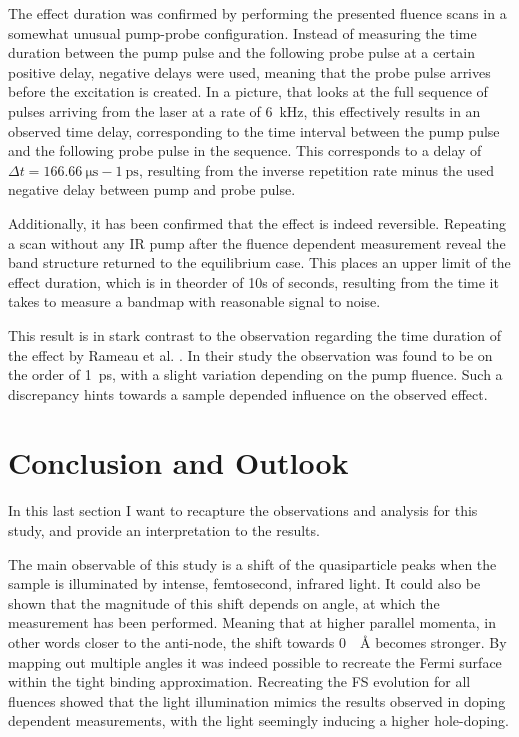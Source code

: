 The effect duration was confirmed by performing the presented fluence scans in a somewhat unusual pump-probe configuration.
Instead of measuring the time duration between the pump pulse and the following probe pulse at a certain positive delay, negative delays were used, meaning that the probe pulse arrives before the excitation is created.
In a picture, that looks at the full sequence of pulses arriving from the laser at a rate of \qty{6}{\kilo\hertz}, this effectively results in an observed time delay, corresponding to the time interval between the pump pulse and the following probe pulse in the sequence.
This corresponds to a delay of $\Delta t = \qty{166.66}{\micro\second} - \qty{1}{\pico\second}$, resulting from the inverse repetition rate minus the used negative delay between pump and probe pulse.

Additionally, it has been confirmed that the effect is indeed reversible.
Repeating a scan without any IR pump after the fluence dependent measurement reveal the band structure returned to the equilibrium case.
This places an upper limit of the effect duration, which is in theorder of 10s of seconds, resulting from the time it takes to measure a bandmap with reasonable signal to noise.

This result is in stark contrast to the observation regarding the time duration of the effect by Rameau et al. \cite{}.
In their study the observation was found to be on the order of \qty{1}{\pico\second}, with a slight variation depending on the pump fluence.
Such a discrepancy hints towards a sample depended influence on the observed effect.

\section{Conclusion and Outlook}

In this last section I want to recapture the observations and analysis for this study, and provide an interpretation to the results.

The main observable of this study is a shift of the quasiparticle peaks when the sample is illuminated by intense, femtosecond, infrared light.
It could also be shown that the magnitude of this shift depends on angle, at which the measurement has been performed.
Meaning that at higher parallel momenta, in other words closer to the anti-node, the shift towards \qty{0}{\per\angstrom} becomes stronger.
By mapping out multiple angles it was indeed possible to recreate the Fermi surface within the tight binding approximation.
Recreating the FS evolution for all fluences showed that the light illumination mimics the results observed in doping dependent measurements, with the light seemingly inducing a higher hole-doping.

